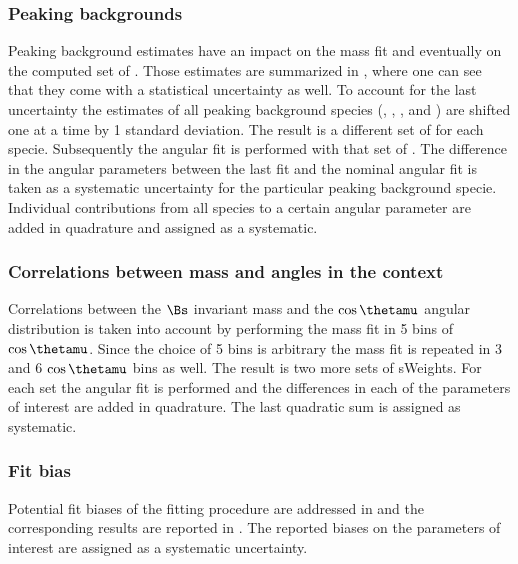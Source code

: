 \subsubsection{Peaking backgrounds}
\label{systPeakBkg}
Peaking background estimates have an impact on the mass fit and eventually on the computed set of \sWeights.
Those estimates are summarized in , where one can see that they come with a statistical uncertainty as well.
To account for the last uncertainty  the estimates of all peaking background species (\BsJpsiKK, \BsJpsipipi, \BdJpsipipi, and \LbJpsipK)
are shifted one at a time by 1 standard deviation. The result is a different set of \sWeights for each specie.
Subsequently the angular fit is performed with that set of \sWeights. The difference in the angular parameters
between the last fit and the nominal angular fit is taken as a systematic uncertainty for the particular peaking background specie.
Individual contributions from all species to a certain angular parameter are added in quadrature and assigned as a systematic.

\subsubsection{Correlations between mass and angles in the \sPlot context}
\label{systCorrs}
Correlations between the $\Bs$ invariant mass and the $\cos\thetamu$ angular distribution is taken into account
by performing the mass fit in 5 bins of $\cos\thetamu$. Since the choice of 5 bins is arbitrary the mass fit is
repeated in 3 and 6 $\cos\thetamu$ bins as well. The result is two more sets of sWeights. For each set the angular
fit is performed and the differences in each of the parameters of interest are added in quadrature. The last quadratic
sum is assigned as systematic.

\subsubsection{Fit bias}
\label{systFitBias}
Potential fit biases of the fitting procedure are addressed in  and the corresponding
results are reported in . The reported biases on the parameters of interest are assigned as a systematic uncertainty.

